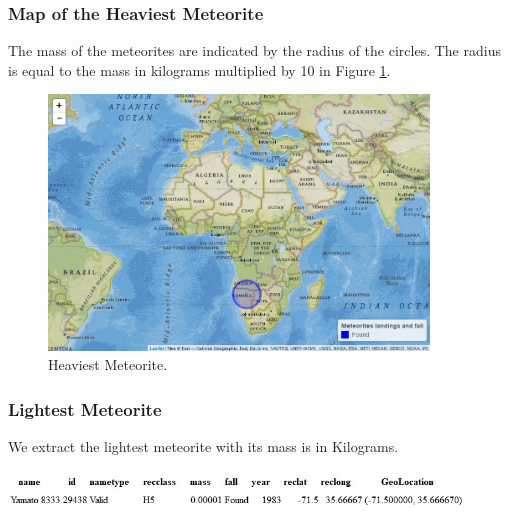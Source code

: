 \subsubsection{Map of the Heaviest Meteorite}
The mass of the meteorites are indicated by the radius of the circles. The radius is equal to the mass in kilograms multiplied by 10 in Figure \ref{fig:fig8}.
\begin{figure}
	\centering
	\includegraphics[width=0.9\textwidth]{Figures/08HeaviestMeteorite.jpeg}
	\caption{\label{fig:fig8} Heaviest Meteorite.}
\end{figure}

\subsubsection{Lightest Meteorite}
We extract the lightest meteorite with its mass is in Kilograms.
\begin{center}
	\centering
	\includegraphics[width=0.9\textwidth]{Figures/10ValidLightestMeteorite.jpeg}
\end{center}

